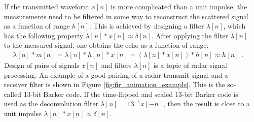 If the transmitted waveform $x[n]$ is more complicated than a unit
impulse, the measurements need to be filtered in some way to
reconstruct the scattered signal as a function of range $h[n]$. This
is achieved by designing a filter $\lambda[n]$, which has the
following property $\lambda[n]*x[n] \approx \delta[n]$. After applying
the filter $\lambda[n]$ to the measured signal, one obtains the echo
as a function of range:
\begin{align}
\lambda[n]*m[n] = \lambda[n]*h[n]*x[n] = (\lambda[n]*x[n])*h[n]\approx h[n]\,\,. 
\end{align}
Design of pairs of signals $x[n]$ and filters $\lambda[n]$ is a topic
of radar signal processing. An example of a good pairing of a radar
transmit signal and a receiver filter is shown in Figure
\ref{fig:fir_animation_example}. This is the so-called 13-bit Barker
code. If the time-flipped and scaled 13-bit Barker code is used as the
deconvolution filter $\lambda[n]=13^{-1}x[-n]$, then the result is close to a unit impulse $\lambda[n]*x[n] \approx \delta[n]$.
